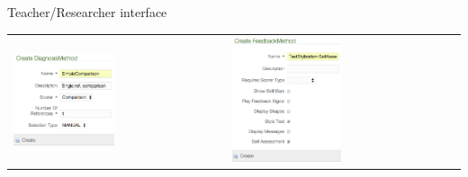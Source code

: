 \documentclass[xcolor={dvipsnames}]{beamer}
\begin{document}
		\begin{frame}{Teacher/Researcher interface}
		\begin{tabular}{p{} p{}}
			  \vspace{0pt} \includegraphics[width=0.49\textwidth]{createDM} &
			  \vspace{0pt} \includegraphics[width=0.49\textwidth]{createFM}
		\end{tabular}
		\end{frame}
		
\end{document}
